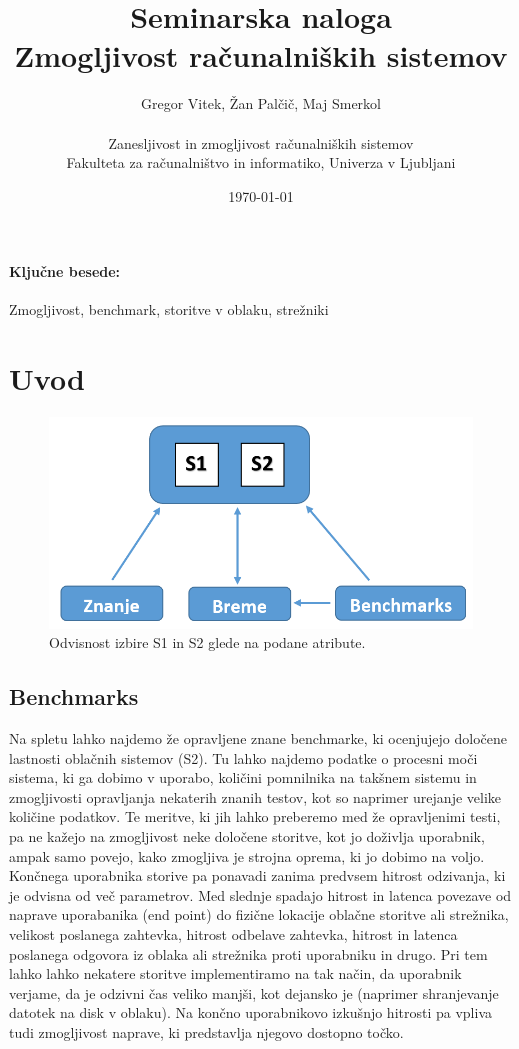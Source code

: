 \documentclass[11pt]{article}
\title{Seminarska naloga \\ Zmogljivost računalniških sistemov}
\author{Gregor Vitek, Žan Palčič, Maj Smerkol\\
\
\\Zanesljivost in zmogljivost računalniških sistemov\\
Fakulteta za računalništvo in informatiko, Univerza v Ljubljani}
\date{\today}
\begin{document}
\maketitle

\paragraph*{Ključne besede:}
Zmogljivost, benchmark, storitve v oblaku, strežniki

\section{Uvod}

\begin{figure}[H]
\centerline{\includegraphics[scale=0.5]
{vzorec.PNG}}
\caption{Odvisnost izbire S1 in S2 glede na podane atribute.}
\label{fig:miselni}
\end{figure}
\subsection{Benchmarks}

Na spletu lahko najdemo že opravljene znane benchmarke\cite{Benchmarks}, ki ocenjujejo določene lastnosti oblačnih sistemov (S2). Tu lahko najdemo podatke o procesni moči sistema, ki ga dobimo v uporabo, količini pomnilnika na takšnem sistemu in zmogljivosti opravljanja nekaterih znanih testov, kot so naprimer urejanje velike količine podatkov. Te meritve, ki jih lahko preberemo med že opravljenimi testi, pa ne kažejo na zmogljivost neke določene storitve, kot jo doživlja uporabnik, ampak samo povejo, kako zmogljiva je strojna oprema, ki jo dobimo na voljo. Končnega uporabnika storive pa ponavadi zanima predvsem hitrost odzivanja, ki je odvisna od več parametrov.
Med slednje spadajo hitrost in latenca povezave od naprave uporabanika (end point) do fizične lokacije oblačne storitve ali strežnika, velikost poslanega zahtevka, hitrost odbelave zahtevka, hitrost in latenca poslanega odgovora iz oblaka ali strežnika proti uporabniku in drugo. Pri tem lahko lahko nekatere storitve implementiramo na tak način, da uporabnik verjame, da je odzivni čas veliko manjši, kot dejansko je (naprimer shranjevanje datotek na disk v oblaku). Na končno uporabnikovo izkušnjo hitrosti pa vpliva tudi zmogljivost naprave, ki predstavlja njegovo dostopno točko. 
\end{document}
